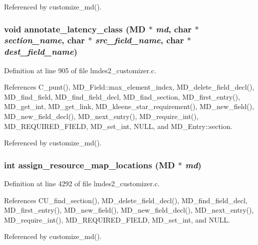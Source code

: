 Referenced by customize\_\-md().
\subsubsection{\setlength{\rightskip}{0pt plus 5cm}void annotate\_\-latency\_\-class (\bf{MD} $\ast$ {\em md}, char $\ast$ {\em section\_\-name}, char $\ast$ {\em src\_\-field\_\-name}, char $\ast$ {\em dest\_\-field\_\-name})}\label{lmdes2__customizer_8c_4f7bcf59270a7e4092afdc10b639fc36}




Definition at line 905 of file lmdes2\_\-customizer.c.

References C\_\-punt(), MD\_\-Field::max\_\-element\_\-index, MD\_\-delete\_\-field\_\-decl(), MD\_\-find\_\-field, MD\_\-find\_\-field\_\-decl, MD\_\-find\_\-section, MD\_\-first\_\-entry(), MD\_\-get\_\-int, MD\_\-get\_\-link, MD\_\-kleene\_\-star\_\-requirement(), MD\_\-new\_\-field(), MD\_\-new\_\-field\_\-decl(), MD\_\-next\_\-entry(), MD\_\-require\_\-int(), MD\_\-REQUIRED\_\-FIELD, MD\_\-set\_\-int, NULL, and MD\_\-Entry::section.

Referenced by customize\_\-md().
\subsubsection{\setlength{\rightskip}{0pt plus 5cm}int assign\_\-resource\_\-map\_\-locations (\bf{MD} $\ast$ {\em md})}\label{lmdes2__customizer_8c_80f65397ab1027641ff4bae7d6b48595}




Definition at line 4292 of file lmdes2\_\-customizer.c.

References CU\_\-find\_\-section(), MD\_\-delete\_\-field\_\-decl(), MD\_\-find\_\-field\_\-decl, MD\_\-first\_\-entry(), MD\_\-new\_\-field(), MD\_\-new\_\-field\_\-decl(), MD\_\-next\_\-entry(), MD\_\-require\_\-int(), MD\_\-REQUIRED\_\-FIELD, MD\_\-set\_\-int, and NULL.

Referenced by customize\_\-md().
